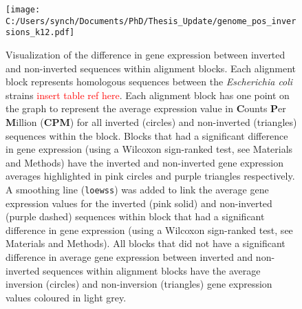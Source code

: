 \documentclass[12pt]{article}
\newcommand{\ecoli}{\textit{Escherichia coli}\xspace}
\begin{document}
\begin{figure}
	\texttt{[image: C:/Users/synch/Documents/PhD/Thesis\_Update/genome\_pos\_inversions\_k12.pdf]}
	\caption{\label{fig:inver_exp} Visualization of the difference in gene expression between inverted and non-inverted sequences within alignment blocks. Each alignment block represents homologous sequences between the \ecoli strains \textcolor{red}{insert table ref here}. Each alignment block has one point on the graph to represent the average expression value in \textbf{C}ounts \textbf{P}er \textbf{M}illion (\textbf{CPM}) for all inverted (circles) and non-inverted (triangles) sequences within the block. Blocks that had a significant difference in gene expression (using a Wilcoxon sign-ranked test, see Materials and Methods) have the inverted and non-inverted gene expression averages highlighted in pink circles and purple triangles respectively. A smoothing line (\texttt{loewss}) was added to link the average gene expression values for the inverted (pink solid) and non-inverted (purple dashed) sequences within block that had a significant difference in gene expression (using a Wilcoxon sign-ranked test, see Materials and Methods). All blocks that did not have a significant difference in average gene expression between inverted and non-inverted sequences within alignment blocks have the average inversion (circles) and non-inversion (triangles) gene expression values coloured in light grey.}
\end{figure}
\end{document}
